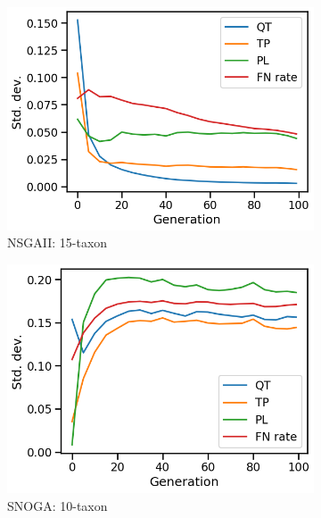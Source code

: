 \begin{figure}[!htbp]
\begin{adjustwidth}{-1cm}{-1cm}
\begin{subfigure}[b]{0.4\textwidth}
			\includegraphics[width=\textwidth]{Figure/15-taxon_NSGAII_std_dev}
			\caption{NSGAII: 15-taxon}
		\end{subfigure}
		\begin{subfigure}[b]{0.4\textwidth}
			\includegraphics[width=\textwidth]{Figure/10-taxon_NOSSGA_std_dev}
			\caption{SNOGA: 10-taxon}
		\end{subfigure}%
		\begin{subfigure}[b]{0.4\textwidth}

\end{subfigure}
\end{adjustwidth}
\end{figure}

